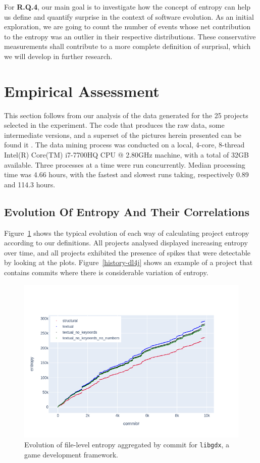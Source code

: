 \documentclass[10pt,conference]{IEEEtran}
\begin{document}
For \textbf{R.Q.4}, our main goal is to investigate how the concept of entropy can help us define and quantify surprise in the context of software evolution. As an initial exploration, we are going to count the number of events whose net contribution to the entropy was an outlier in their respective distributions. These conservative measurements shall contribute to a more complete definition of surprisal, which we will develop in further research.

\section{Empirical Assessment}
This section follows from our analysis of the data generated for the 25 projects selected in the experiment. The code that produces the raw data, some intermediate versions, and a superset of the pictures herein presented can be found it \cite{anonymousRepo}.
The data mining process was conducted on a local, 4-core, 8-thread Intel(R) Core(TM) i7-7700HQ CPU @ 2.80GHz machine, with a total of 32GB available. Three processes at a time were run concurrently. Median processing time was 4.66 hours, with the fastest and slowest runs taking, respectively 0.89 and 114.3 hours.

\subsection{Evolution Of Entropy And Their Correlations}

Figure~\ref{history-libgdx} shows the typical evolution of each way of calculating project entropy according to our definitions. All projects analysed displayed increasing entropy over time, and all projects exhibited the presence of spikes that were detectable by looking at the plots. Figure~\ref{history-dl4j} shows an example of a project that contains commits where there is considerable variation of entropy.

\begin{figure}
    \centering
    \includegraphics[width=\linewidth,trim=0 30 60 90,clip]{project-entropy-history/libgdx.png}
    \caption{Evolution of file-level entropy aggregated by commit for \texttt{libgdx}, a game development framework.}
    \label{history-libgdx}
\end{figure}
\end{document}
